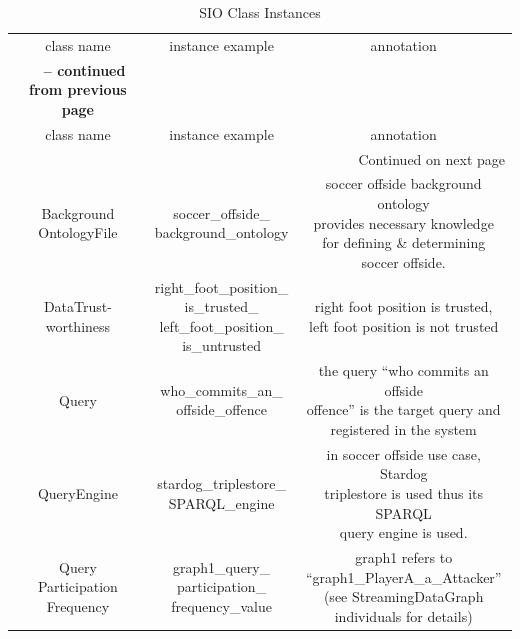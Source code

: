 \begin{center}
\begin{longtable}{|c||c||c|}
	\caption[SIO Class Instances]{SIO Class Instances} \label{tab:app-gi} \\
	\hline \multicolumn{1}{|c||}{class name} & \multicolumn{1}{c||}{instance example} & \multicolumn{1}{c|}{annotation} \\ \hhline{|=#=#=|}
	\endfirsthead
	\multicolumn{3}{c}%
	{{\bfseries \tablename\ \thetable{} -- continued from previous page}} \\
	\hline \multicolumn{1}{|c||}{class name} &
	\multicolumn{1}{c||}{instance example} &
	\multicolumn{1}{c|}{annotation} \\ \hline 
	\endhead
	\hline \multicolumn{3}{|r|}{{Continued on next page}} \\ \hline
	\endfoot
	\hline
	\endlastfoot
	\makecell{Background\\OntologyFile} & \makecell{soccer\_offside\_\\background\_ontology} & \makecell[l]{soccer offside background ontology \\ provides necessary knowledge \\ for defining \& determining \\soccer offside.} \\ \hline
	\makecell{DataTrust-\\worthiness} & \makecell{right\_foot\_position\_\\is\_trusted\_\\left\_foot\_position\_\\is\_untrusted} & \makecell[l]{right foot position is trusted, \\left foot position is not trusted} \\ \hline
	Query & \makecell{who\_commits\_an\_\\offside\_offence} & \makecell[l]{the query ``who commits an offside \\offence'' is the target query and \\registered in the system} \\ \hline
	QueryEngine & \makecell{stardog\_triplestore\_\\SPARQL\_engine} & \makecell[l]{in soccer offside use case, Stardog \\triplestore is used thus its SPARQL \\query engine is used.} \\ \hline
	\makecell{Query\\Participation\\Frequency} & \makecell{graph1\_query\_\\participation\_\\frequency\_value} & \makecell[l]{graph1 refers to\\``graph1\_PlayerA\_a\_Attacker''\\ (see StreamingDataGraph \\individuals for details)} \\ \hline

\end{longtable}
\end{center}
